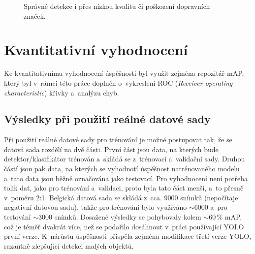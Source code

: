 \begin{figure}[H]
    \centering
    \hfill
    \caption{Správné detekce i přes nízkou kvalitu či poškození dopravních značek.}
    \label{fig:correctDetectionsBroken}
\end{figure}


\section{Kvantitativní vyhodnocení}
Ke kvantitativnímu vyhodnocení úspěšnosti byl využit zejména repozitář mAP\footnotemark, který byl v~rámci této práce doplněn o~vykreslení ROC (\emph{Receiver operating characteristic}) křivky a~analýzu chyb.


\subsection*{Výsledky při použití reálné datové sady}
\label{vysledkyRealDataset}
Při použití reálné datové sady pro trénování je možné postupovat tak, že se datová sada rozdělí na dvě části. První část jsou data, na kterých bude detektor/klasifikátor trénován a~skládá se z~trénovací a~validační sady. Druhou částí jsou pak data, na kterých se vyhodnotí úspěšnost natrénovaného modelu a~tato data jsou běžně označována jako testovací. Pro vyhodnocení není potřeba tolik dat, jako pro trénování a~validaci, proto byla tato část menší, a~to přesně v~poměru 2:1. Belgická datová sada se skládá z~cca. 9000 snímků (nepočítaje negativní datovou sadu), takže pro trénování bylo využíváno $\sim6000$ a~pro testování $\sim3000$ snímků. Dosažené výsledky se pohybovaly kolem $\sim60\,\%$ mAP, což je téměř dvakrát více, než se podařilo dosáhnout v~práci \cite{tsdYolo} používající YOLO první verze. K~nárůstu úspěšnosti přispěla zejména modifikace třetí verze YOLO, razantně zlepšující detekci malých objektů.


